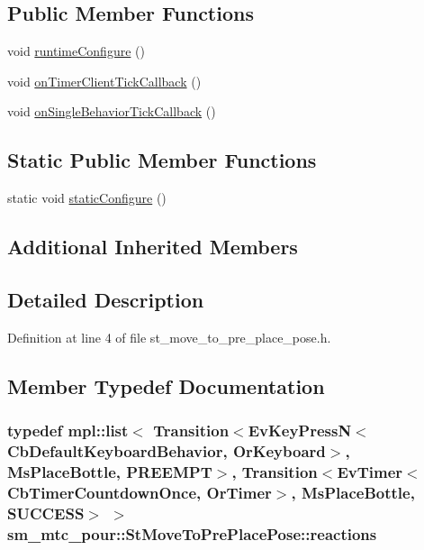 \subsection*{Public Member Functions}
\begin{DoxyCompactItemize}
\item 
void \hyperlink{structsm__mtc__pour_1_1StMoveToPrePlacePose_acca5a70ca5e4ad5957ea407a833d69be}{runtime\+Configure} ()
\item 
void \hyperlink{structsm__mtc__pour_1_1StMoveToPrePlacePose_a62a25ac1f88dcc95a17e175922d351ab}{on\+Timer\+Client\+Tick\+Callback} ()
\item 
void \hyperlink{structsm__mtc__pour_1_1StMoveToPrePlacePose_abd216effe4b9a990035dd213dd0720c0}{on\+Single\+Behavior\+Tick\+Callback} ()
\end{DoxyCompactItemize}
\subsection*{Static Public Member Functions}
\begin{DoxyCompactItemize}
\item 
static void \hyperlink{structsm__mtc__pour_1_1StMoveToPrePlacePose_ab8c230901ff4c539fcc6d1696b8004a2}{static\+Configure} ()
\end{DoxyCompactItemize}
\subsection*{Additional Inherited Members}


\subsection{Detailed Description}


Definition at line 4 of file st\+\_\+move\+\_\+to\+\_\+pre\+\_\+place\+\_\+pose.\+h.



\subsection{Member Typedef Documentation}
\subsubsection[{\texorpdfstring{reactions}{reactions}}]{\setlength{\rightskip}{0pt plus 5cm}typedef mpl\+::list$<$ Transition$<$Ev\+Key\+PressN$<$Cb\+Default\+Keyboard\+Behavior, {\bf Or\+Keyboard}$>$, {\bf Ms\+Place\+Bottle}, {\bf P\+R\+E\+E\+M\+PT}$>$, Transition$<$Ev\+Timer$<$Cb\+Timer\+Countdown\+Once, {\bf Or\+Timer}$>$, {\bf Ms\+Place\+Bottle}, {\bf S\+U\+C\+C\+E\+SS}$>$ $>$ {\bf sm\+\_\+mtc\+\_\+pour\+::\+St\+Move\+To\+Pre\+Place\+Pose\+::reactions}}\hypertarget{structsm__mtc__pour_1_1StMoveToPrePlacePose_af46dda752789a8cf4775a2399e84822f}{}\label{structsm__mtc__pour_1_1StMoveToPrePlacePose_af46dda752789a8cf4775a2399e84822f}


